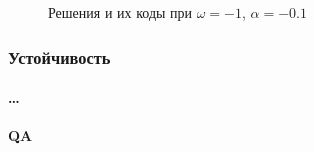 \documentclass{beamer}
\begin{document}
\begin{frame}	
	\begin{figure}
		\caption{Решения и их коды при $\omega = -1$, $\alpha = -0.1$}
		\label{pic:classification}
	\end{figure}
\end{frame}

\begin{frame}
	\frametitle{Устойчивость}
	\framesubtitle{\dots}	
\end{frame}

\begin{frame}
	\begin{center}
		{\bf QA}
	\end{center}
\end{frame}
\end{document}
